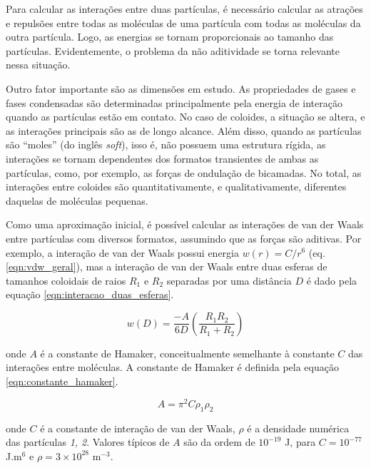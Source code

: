 	Para calcular as interações entre duas partículas, é necessário calcular as atrações e repulsões entre todas as moléculas de uma partícula com todas as moléculas da outra partícula. Logo, as energias se tornam proporcionais ao tamanho das partículas. Evidentemente, o problema da não aditividade se torna relevante nessa situação.
	
	Outro fator importante são as dimensões em estudo. As propriedades de gases e fases condensadas são determinadas principalmente pela energia de interação quando as partículas estão em contato. No caso de coloides, a situação se altera, e as interações principais são as de longo alcance. Além disso, quando as partículas são ``moles'' (do inglês \emph{soft}), isso é, não possuem uma estrutura rígida, as interações se tornam dependentes dos formatos transientes de ambas as partículas, como, por exemplo, as forças de ondulação de bicamadas. No total, as interações entre coloides são quantitativamente, e qualitativamente, diferentes daquelas de moléculas pequenas. %
	
	Como uma aproximação inicial, é possível calcular as interações de van der Waals entre partículas com diversos formatos, assumindo que as forças são aditivas. Por exemplo, a interação de van der Waals possui energia \(w(r) = C/r^6\) (eq. \ref{eqn:vdw_geral}), mas a interação de van der Waals entre duas esferas de tamanhos coloidais de raios \(R_1\) e \(R_2\) separadas por uma distância \(D\) é dado pela equação \ref{eqn:interacao_duas_esferas}.
	
	\begin{equation}
		w(D) = \dfrac{-A}{6D} \left( \dfrac{R_1R_2}{R_1 + R_2}   \right)
		\label{eqn:interacao_duas_esferas}
	\end{equation}
	
	\noindent onde \(A\) é a constante de Hamaker, conceitualmente semelhante à constante \(C\) das interações entre moléculas. A constante de Hamaker é  definida pela equação \ref{eqn:constante_hamaker}.
	
	\begin{equation}
		A = \pi^2 C \rho_1 \rho_2
		\label{eqn:constante_hamaker}
	\end{equation}
	
	\noindent onde \(C\) é a constante de interação de van der Waals, \(\rho\) é a densidade numérica das partículas \emph{1, 2}. Valores típicos de \(A\) são da ordem de \(10^{-19}\) J, para \(C = 10^{-77}\) J.m\(^6\) e \(\rho=3 \times 10^{28}\) m\(^{-3}\).
	
